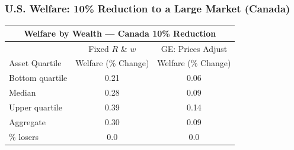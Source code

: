 \documentclass[9pt,pdftex,aspectratio=1610]{beamer}
\theoremstyle{definition}
\begin{document}
\begin{frame}[t]
\frametitle{U.S. Welfare: 10\% Reduction to a Large Market (Canada)}
\begin{table}[!t]
\footnotesize
\setlength {\tabcolsep}{6.05mm}
\renewcommand{\arraystretch}{1.80}
\begin{center}
\begin{tabular}{l c c}
\multicolumn{3}{c}{\small \textbf{Welfare by Wealth --- Canada {\color{red} 10\%} Reduction}}\\
\hline
\hline
& \footnotesize  Fixed $R$ \& $w$ & GE: Prices Adjust \\
\cmidrule(lr){2-2}  \cmidrule(lr){3-3}
\footnotesize  Asset Quartile & \footnotesize  Welfare (\% Change) & \footnotesize  Welfare (\% Change) \\
\footnotesize  Bottom quartile  & 0.21 & 0.06 \\
\footnotesize  Median & 0.28 & 0.09 \\
\footnotesize  Upper quartile  & 0.39 & 0.14  \\
\footnotesize  Aggregate & 0.30 &  0.09 \\
\cmidrule(lr){2-2}  \cmidrule(lr){3-3}
\footnotesize  \% losers & 0.0 & 0.0\\
\hline
\end{tabular}
\end{center}
\end{table}
\end{frame}


\end{document}
